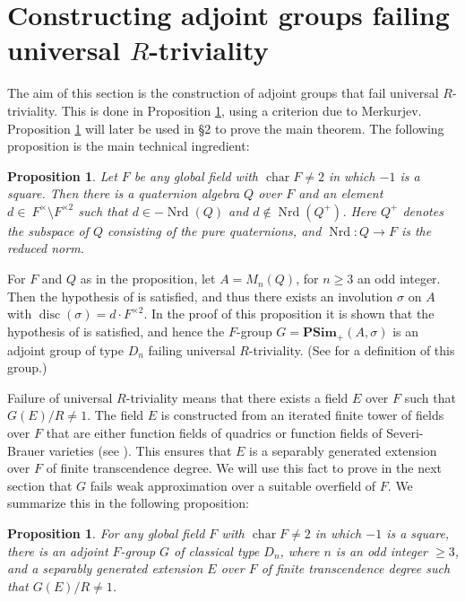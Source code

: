 \documentclass[11pt,letterpaper]{amsart}
\theoremstyle{plain}
\newtheorem{proposition}[theorem]{Proposition}
\theoremstyle{definition}
\theoremstyle{remark}
\begin{document}
    \section{Constructing adjoint groups failing universal $R$-triviality}

    The aim of this section is the construction of adjoint groups that fail universal $R$-triviality. This is done in Proposition \ref{merk-psim}, using a criterion due to Merkurjev. Proposition \ref{merk-psim} will later be used in \S 2 to prove the main theorem. The following proposition is the main technical ingredient:
    
    \begin{proposition}\label{main-prop-sec1}
    Let $F$ be any global field with $\operatorname{char}F\neq 2$ in which $-1$ is a square. Then there is a quaternion algebra $Q$ over $F$ and an element~ $d\in~ F^{\times}\setminus F^{\times 2}$ such that $d\in -\operatorname{Nrd}(Q)$ and $d\notin\operatorname{Nrd}(Q^+)$. Here $Q^+$ denotes the subspace of $Q$ consisting of the pure quaternions, and $\operatorname{Nrd}\colon Q\to F$ is the reduced norm.
\end{proposition}

    For $F$ and $Q$ as in the proposition, let $A = M_n(Q)$, for $n\geq 3$ an odd integer. Then the hypothesis of \cite[Proposition 11]{merkurjev1996r} is satisfied, and thus there exists an involution $\sigma$ on $A$ with $\operatorname{disc}(\sigma) = d\cdot F^{\times 2}$. In the proof of this proposition it is shown that the hypothesis of \cite[Theorem 2]{merkurjev1996r} is satisfied, and hence the $F$-group $G = \mathbf{PSim}_+(A,\sigma)$ is an adjoint group of type $D_n$ failing universal $R$-triviality. (See \cite[p.2]{berhuy2004cohomological} for a definition of this group.)

    Failure of universal $R$-triviality means that there exists a field $E$ over $F$ such that $G(E)/R\neq 1$. The field $E$ is constructed from an iterated finite tower of fields over $F$ that are either function fields of quadrics or function fields of Severi-Brauer varieties (see \cite[Theorem 2]{merkurjev1996r}). This ensures that $E$ is a separably generated extension over $F$ of finite transcendence degree. We will use this fact to prove in the next section that $G$ fails weak approximation over a suitable overfield of $F$. We summarize this in the following proposition:
    \begin{proposition}\label{merk-psim}
        For any global field $F$ with $\operatorname{char}F\neq 2$ in which $-1$ is a square, there is an adjoint $F$-group $G$ of classical type $D_n$, where $n$ is an odd integer $\geq 3$, and a separably generated extension $E$ over $F$ of finite transcendence degree such that $G(E)/R\neq 1$.
    \end{proposition}
\end{document}
